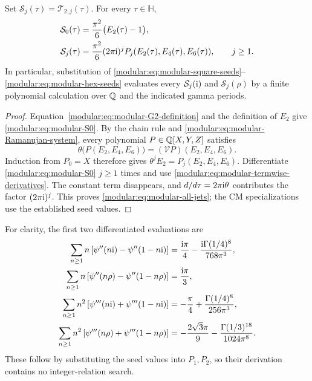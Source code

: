 \begin{theorem}
\label{modular:thm:modular-all-jets}
Set \(\mathcal S_j(\tau)=\mathcal T_{2,j}(\tau)\). For every
\(\tau\in\mathbb H\),
\begin{align}
\mathcal S_0(\tau)&=\frac{\pi^2}{6}\bigl(E_2(\tau)-1\bigr),
\label{modular:eq:modular-S0}\\
\mathcal S_j(\tau)&=\frac{\pi^2}{6}(2\pi\mathrm{i})^j
 P_j(E_2(\tau),E_4(\tau),E_6(\tau)),\qquad j\ge1.
\label{modular:eq:modular-all-jets}
\end{align}
In particular, substitution of
\eqref{modular:eq:modular-square-seeds}--\eqref{modular:eq:modular-hex-seeds}
evaluates every \(\mathcal S_j(\mathrm{i})\) and
\(\mathcal S_j(\rho)\) by a finite polynomial calculation over
\(\mathbb{Q}\) and the indicated gamma periods.
\end{theorem}

\begin{proof}
Equation~\eqref{modular:eq:modular-G2-definition} and the definition of
\(E_2\) give \eqref{modular:eq:modular-S0}. By the chain rule and
\eqref{modular:eq:modular-Ramanujan-system}, every polynomial
\(P\in\mathbb{Q}[X,Y,Z]\) satisfies
\[
\theta\bigl(P(E_2,E_4,E_6)\bigr)
=(\mathcal V P)(E_2,E_4,E_6).
\]
Induction from \(P_0=X\) therefore gives
\(\theta^jE_2=P_j(E_2,E_4,E_6)\).
Differentiate \eqref{modular:eq:modular-S0} \(j\ge1\) times and use
\eqref{modular:eq:modular-termwise-derivatives}. The constant term disappears,
and \(d/d\tau=2\pi\mathrm{i}\theta\) contributes the factor
\((2\pi\mathrm{i})^j\). This proves \eqref{modular:eq:modular-all-jets}; the CM
specializations use the established seed values.
\end{proof}

For clarity, the first two differentiated evaluations are
\begin{align}
\sum_{n\ge1}n\left[\psi''(n\mathrm{i})-\psi''(1-n\mathrm{i})\right]
 &=\frac{\mathrm{i}\pi}{4}
   -\frac{\mathrm{i}\Gamma(1/4)^8}{768\pi^3},
\label{modular:eq:modular-S1-square}\\
\sum_{n\ge1}n\left[\psi''(n\rho)-\psi''(1-n\rho)\right]
 &=\frac{\mathrm{i}\pi}{3},
\label{modular:eq:modular-S1-hex}\\
\sum_{n\ge1}n^2\left[\psi'''(n\mathrm{i})+\psi'''(1-n\mathrm{i})\right]
 &=-\frac\pi4+\frac{\Gamma(1/4)^8}{256\pi^3},
\label{modular:eq:modular-S2-square}\\
\sum_{n\ge1}n^2\left[\psi'''(n\rho)+\psi'''(1-n\rho)\right]
 &=-\frac{2\sqrt3\pi}{9}
   -\frac{\Gamma(1/3)^{18}}{1024\pi^8}.
\label{modular:eq:modular-S2-hex}
\end{align}
These follow by substituting the seed values into \(P_1,P_2\), so
their derivation contains no integer-relation search.

